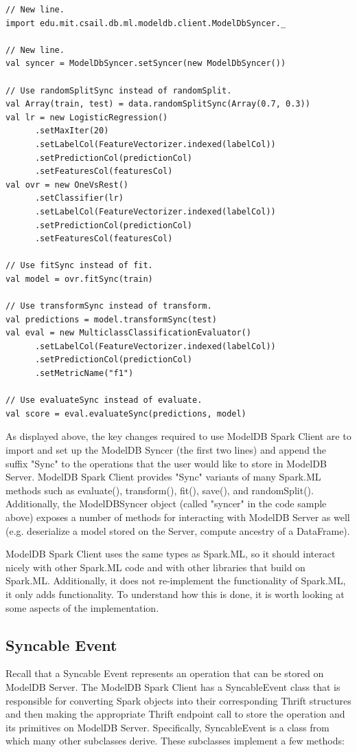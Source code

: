 \begin{verbatim}
// New line.
import edu.mit.csail.db.ml.modeldb.client.ModelDbSyncer._

// New line.
val syncer = ModelDbSyncer.setSyncer(new ModelDbSyncer())

// Use randomSplitSync instead of randomSplit.
val Array(train, test) = data.randomSplitSync(Array(0.7, 0.3))
val lr = new LogisticRegression()
      .setMaxIter(20)
      .setLabelCol(FeatureVectorizer.indexed(labelCol))
      .setPredictionCol(predictionCol)
      .setFeaturesCol(featuresCol)
val ovr = new OneVsRest()
      .setClassifier(lr)
      .setLabelCol(FeatureVectorizer.indexed(labelCol))
      .setPredictionCol(predictionCol)
      .setFeaturesCol(featuresCol)

// Use fitSync instead of fit.
val model = ovr.fitSync(train)

// Use transformSync instead of transform.
val predictions = model.transformSync(test)
val eval = new MulticlassClassificationEvaluator()
      .setLabelCol(FeatureVectorizer.indexed(labelCol))
      .setPredictionCol(predictionCol)
      .setMetricName("f1")

// Use evaluateSync instead of evaluate.
val score = eval.evaluateSync(predictions, model)
\end{verbatim}

As displayed above, the key changes required to use ModelDB Spark Client are to
import and set up the ModelDB Syncer (the first two lines) and append the suffix
"Sync" to the operations that the user would like to store in ModelDB Server. ModelDB
Spark Client provides "Sync" variants of many Spark.ML methods such as evaluate(),
transform(), fit(), save(), and randomSplit(). Additionally, the ModelDBSyncer
object (called "syncer" in the code sample above) exposes a number of methods for
interacting with ModelDB Server as well (e.g. deserialize a model stored on the
Server, compute ancestry of a DataFrame).

ModelDB Spark Client uses the same types as Spark.ML, so it should interact nicely
with other Spark.ML code and with other libraries that build on Spark.ML. Additionally,
it does not re-implement the functionality of Spark.ML, it only adds functionality. To
understand how this is done, it is worth looking at some aspects of the implementation.

\subsection{Syncable Event}
Recall that a Syncable Event represents an operation that can be stored on ModelDB Server.
The ModelDB Spark Client has a SyncableEvent class that is responsible for converting Spark objects
into their corresponding Thrift structures and then making the appropriate Thrift endpoint call to
store the operation and its primitives on ModelDB Server. Specifically, SyncableEvent is a class
from which many other subclasses derive. These subclasses implement a few methods:

